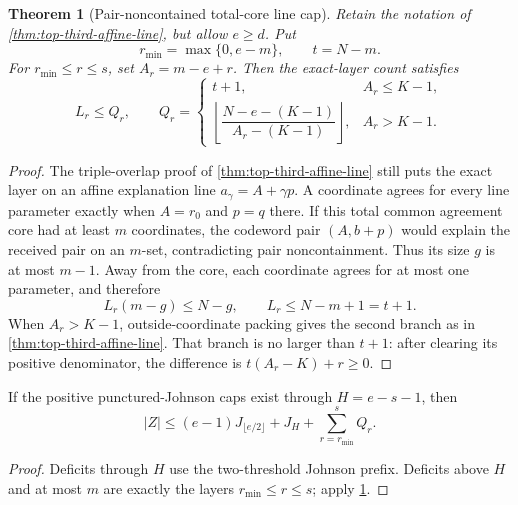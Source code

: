 \documentclass[11pt,a4paper]{amsart}
\numberwithin{equation}{section}
\newtheorem{theorem}{Theorem}[section]
\theoremstyle{remark}
\begin{document}
\begin{theorem}[Pair-noncontained total-core line cap]
\label{thm:full-lift-total-core-line}
Retain the notation of \cref{thm:top-third-affine-line}, but allow
\(e\ge d\).  Put
\[
 r_{\min}=\max\{0,e-m\},
 \qquad t=N-m.
\]
For \(r_{\min}\le r\le s\), set \(A_r=m-e+r\).  Then the exact-layer count
satisfies
\begin{equation}
 L_r\le Q_r,\qquad
 Q_r=
 \begin{cases}
 t+1,&A_r\le K-1,\\[2mm]
 \left\lfloor\dfrac{N-e-(K-1)}{A_r-(K-1)}\right\rfloor,
     &A_r>K-1.
 \end{cases}
 \label{eq:full-lift-total-core-line}
\end{equation}
\end{theorem}

\begin{proof}
The triple-overlap proof of \cref{thm:top-third-affine-line} still puts the
exact layer on an affine explanation line
\(a_\gamma=A+\gamma p\).  A coordinate agrees for every line parameter
exactly when \(A=r_0\) and \(p=q\) there.  If this total common agreement
core had at least \(m\) coordinates, the codeword pair \((A,b+p)\) would
explain the received pair on an \(m\)-set, contradicting pair
noncontainment.  Thus its size \(g\) is at most \(m-1\).  Away from the
core, each coordinate agrees for at most one parameter, and therefore
\[
 L_r(m-g)\le N-g,
 \qquad L_r\le N-m+1=t+1.
\]
When \(A_r>K-1\), outside-coordinate packing gives the second branch as in
\cref{thm:top-third-affine-line}.  That branch is no larger than \(t+1\):
after clearing its positive denominator, the difference is
\(t(A_r-K)+r\ge0\).
\end{proof}

\begin{corollary}
\label{cor:full-lift-common-core-profile}
If the positive punctured-Johnson caps exist through \(H=e-s-1\), then
\begin{equation}
 |Z|\le
 (e-1)J_{\lfloor e/2\rfloor}+J_H
 +\sum_{r=r_{\min}}^{s}Q_r.
 \label{eq:full-lift-common-core-profile}
\end{equation}
\end{corollary}

\begin{proof}
Deficits through \(H\) use the two-threshold Johnson prefix.  Deficits
above \(H\) and at most \(m\) are exactly the layers
\(r_{\min}\le r\le s\); apply \cref{thm:full-lift-total-core-line}.
\end{proof}
\end{document}
